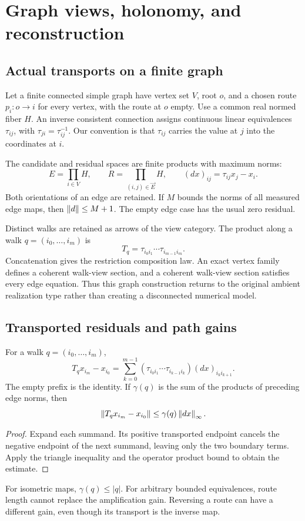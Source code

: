 \section{Graph views, holonomy, and reconstruction}\label{sec:graph}
\subsection{Actual transports on a finite graph}
Let a finite connected simple graph have vertex set \(V\), root \(o\), and a chosen route \(p_i:o\to i\) for every vertex, with the route at \(o\) empty. Use a common real normed fiber \(H\). An inverse consistent connection assigns continuous linear equivalences \(\tau_{ij}\), with \(\tau_{ji}=\tau_{ij}^{-1}\). Our convention is that \(\tau_{ij}\) carries the value at \(j\) into the coordinates at \(i\).

The candidate and residual spaces are finite products with maximum norms:
\[
 E=\prod_{i\in V}H,\qquad
 R=\prod_{(i,j)\in\vec E}H,\qquad
 (dx)_{ij}=\tau_{ij}x_j-x_i.
\]
Both orientations of an edge are retained. If \(M\) bounds the norms of all measured edge maps, then \(\left\lVert d\right\rVert\le M+1\). The empty edge case has the usual zero residual.

Distinct walks are retained as arrows of the view category. The product along a walk \(q=(i_0,\ldots,i_m)\) is
\[
 T_q=\tau_{i_0i_1}\cdots\tau_{i_{m-1}i_m}.
\]
Concatenation gives the restriction composition law. An exact vertex family defines a coherent walk-view section, and a coherent walk-view section satisfies every edge equation. Thus this graph construction returns to the original ambient realization type rather than creating a disconnected numerical model.

\subsection{Transported residuals and path gains}
\begin{proposition}\label{KS40}
For a walk \(q=(i_0,\ldots,i_m)\),
\[
 T_qx_{i_m}-x_{i_0}
 =\sum_{k=0}^{m-1}
 (\tau_{i_0i_1}\cdots\tau_{i_{k-1}i_k})(dx)_{i_ki_{k+1}}.
\]
The empty prefix is the identity. If \(\gamma(q)\) is the sum of the products of preceding edge norms, then
\[
 \left\lVert T_qx_{i_m}-x_{i_0}\right\rVert\le\gamma(q)\left\lVert dx\right\rVert_\infty.
\]
\end{proposition}
\begin{proof}
Expand each summand. Its positive transported endpoint cancels the negative endpoint of the next summand, leaving only the two boundary terms. Apply the triangle inequality and the operator product bound to obtain the estimate.
\end{proof}
For isometric maps, \(\gamma(q)\le|q|\). For arbitrary bounded equivalences, route length cannot replace the amplification gain. Reversing a route can have a different gain, even though its transport is the inverse map.

